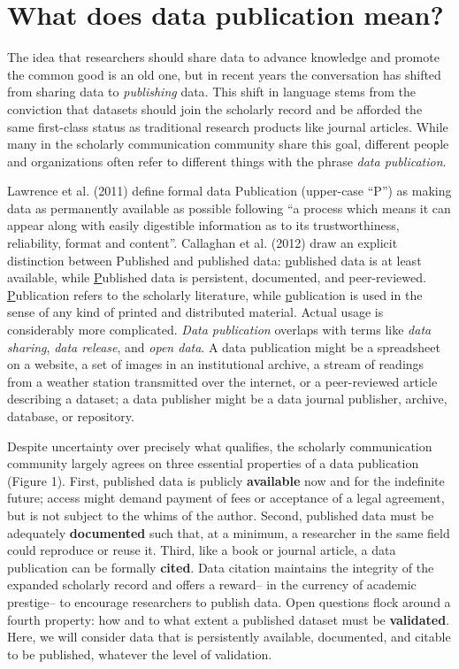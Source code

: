 \documentclass[10pt,a4paper,twocolumn]{article}
\begin{document}
\section*{What does data publication mean?}\label{introduction}

The idea that researchers should share data to advance knowledge and promote the common good is an old one, but in recent years the conversation has shifted from sharing data to \emph{publishing} data\cite{costello_motivating_2009,smith_data_2009,lawrence_citation_2011}.
This shift in language stems from the conviction that datasets should join the scholarly record and be afforded the same first-class status as traditional research products like journal articles\cite{reilly_report_2011, callaghan_making_2012}.
While many in the scholarly communication community share this goal, different people and organizations often refer to different things with the phrase \emph{data publication}.

Lawrence et al. (2011) define formal data Publication (upper-case ``P'') as making data as permanently available as possible following ``a process which means it can appear along with easily digestible information as to its trustworthiness, reliability, format and content''\cite{lawrence_citation_2011}.
Callaghan et al. (2012) draw an explicit distinction between Published and published data: \underline{p}ublished data is at least available, while \underline{P}ublished data is persistent, documented, and peer-reviewed\cite{callaghan_making_2012}.
\underline{P}ublication refers to the scholarly literature, while \underline{p}ublication is used in the sense of any kind of printed and distributed material.
Actual usage is considerably more complicated.
\emph{Data publication} overlaps with terms like \emph{data sharing}, \emph{data release}, and \emph{open data}.
A data publication might be a spreadsheet on a website, a set of images in an institutional archive, a stream of readings from a weather station transmitted over the internet, or a peer-reviewed article describing a dataset; a data publisher might be a data journal publisher, archive, database, or repository.

Despite uncertainty over precisely what qualifies, the scholarly communication community largely agrees on three essential properties of a data publication (Figure 1)\cite{smith_data_2009,callaghan_making_2012}.
First, published data is publicly \textbf{available} now and for the indefinite future; access might demand payment of fees or acceptance of a legal agreement, but is not subject to the whims of the author.
Second, published data must be adequately \textbf{documented} such that, at a minimum, a researcher in the same field could reproduce or reuse it.
Third, like a book or journal article, a data publication can be formally \textbf{cited}.
Data citation maintains the integrity of the expanded scholarly record and offers a reward-- in the currency of academic prestige-- to encourage researchers to publish data. 
Open questions flock around a fourth property: how and to what extent a published dataset must be \textbf{validated}.
Here, we will consider data that is persistently available, documented, and citable to be published, whatever the level of validation. 
\end{document}
